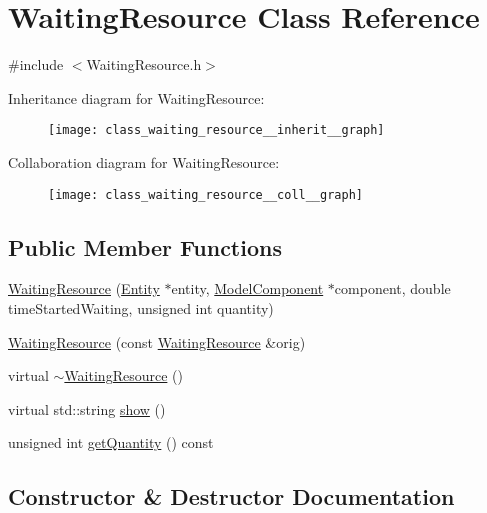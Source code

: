 \hypertarget{class_waiting_resource}{}\section{Waiting\+Resource Class Reference}
\label{class_waiting_resource}


{\ttfamily \#include $<$Waiting\+Resource.\+h$>$}



Inheritance diagram for Waiting\+Resource\+:
\nopagebreak
\begin{figure}[H]
\begin{center}
\leavevmode
\texttt{[image: class\_waiting\_resource\_\_inherit\_\_graph]}
\end{center}
\end{figure}


Collaboration diagram for Waiting\+Resource\+:
\nopagebreak
\begin{figure}[H]
\begin{center}
\leavevmode
\texttt{[image: class\_waiting\_resource\_\_coll\_\_graph]}
\end{center}
\end{figure}
\subsection*{Public Member Functions}
\begin{DoxyCompactItemize}
\item 
\hyperlink{class_waiting_resource_a845b5f09fb41f14f9d084f17094560d5}{Waiting\+Resource} (\hyperlink{class_entity}{Entity} $\ast$entity, \hyperlink{class_model_component}{Model\+Component} $\ast$component, double time\+Started\+Waiting, unsigned int quantity)
\item 
\hyperlink{class_waiting_resource_a7780ace7c4d94f544e7f894c5daaa2f8}{Waiting\+Resource} (const \hyperlink{class_waiting_resource}{Waiting\+Resource} \&orig)
\item 
virtual \hyperlink{class_waiting_resource_ac25ae06be17218e803d623fb1398aa8a}{$\sim$\+Waiting\+Resource} ()
\item 
virtual std\+::string \hyperlink{class_waiting_resource_afb0323a90d99b50d66de7f38d069b122}{show} ()
\item 
unsigned int \hyperlink{class_waiting_resource_a3a2be33ed8850145e393e8bf29c6c7ca}{get\+Quantity} () const 
\end{DoxyCompactItemize}


\subsection{Constructor \& Destructor Documentation}
